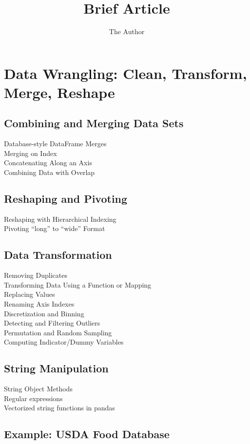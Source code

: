 \documentclass[11pt]{article} %
\title{Brief Article}
\author{The Author}
\begin{document}
\section{Data Wrangling: Clean, Transform, Merge, Reshape}
\subsection{Combining and Merging Data Sets}
Database-style DataFrame Merges\\
Merging on Index\\
Concatenating Along an Axis\\
Combining Data with Overlap\\
\subsection{Reshaping and Pivoting}
Reshaping with Hierarchical Indexing\\
Pivoting “long” to “wide” Format\\
\subsection{Data Transformation}
Removing Duplicates\\
Transforming Data Using a Function or Mapping\\
Replacing Values\\
Renaming Axis Indexes\\
Discretization and Binning\\
Detecting and Filtering Outliers\\
Permutation and Random Sampling\\
Computing Indicator/Dummy Variables\\
\subsection{String Manipulation}
String Object Methods\\
Regular expressions\\
Vectorized string functions in pandas\\

\subsection{Example: USDA Food Database}
\end{document}
